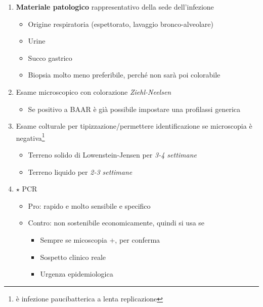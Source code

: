\documentclass[italian,]{article}
\providecommand{\tightlist}{%
  \setlength{\itemsep}{0pt}\setlength{\parskip}{0pt}}
\newcommand{\goldstandard}{\textcircled{$\star$} }                      %
\begin{document}
\begin{enumerate}
\def\labelenumi{\arabic{enumi}.}
\setcounter{enumi}{-1}
\tightlist
\item
  \textbf{Materiale patologico} rappresentativo della sede
  dell'infezione

  \begin{itemize}
  \tightlist
  \item
    Origine respiratoria (espettorato, lavaggio bronco-alveolare)
  \item
    Urine
  \item
    Succo gastrico
  \item
    Biopsia molto meno preferibile, perché non sarà poi colorabile
  \end{itemize}
\item
  Esame microscopico con colorazione \emph{Ziehl-Neelsen}

  \begin{itemize}
  \tightlist
  \item
    Se positivo a BAAR è già possibile impostare una profilassi generica
  \end{itemize}
\item
  Esame colturale per tipizzazione/permettere identificazione se
  microscopia è negativa\footnote{è infezione paucibatterica a lenta
    replicazione}

  \begin{itemize}
  \tightlist
  \item
    Terreno solido di Lowenstein-Jensen per \emph{3-4 settimane}
  \item
    Terreno liquido per \emph{2-3 settimane}
  \end{itemize}
\item
  \goldstandard PCR

  \begin{itemize}
  \tightlist
  \item
    Pro: rapido e molto sensibile e specifico
  \item
    Contro: non sostenibile economicamente, quindi si usa se

    \begin{itemize}
    \tightlist
    \item
      Sempre se micoscopia +, per conferma
    \item
      Sospetto clinico reale
    \item
      Urgenza epidemiologica
    \end{itemize}
  \end{itemize}
\end{enumerate}
\end{document}
